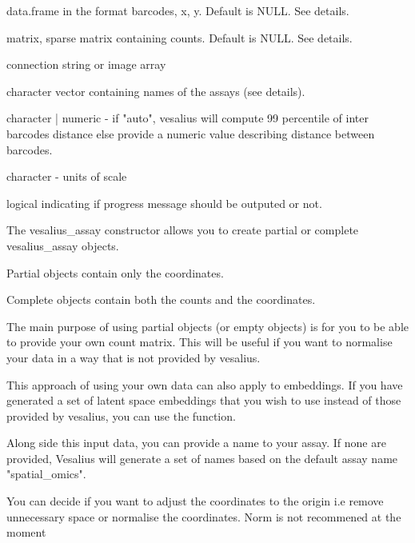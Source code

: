 \documentclass[a4paper]{book}
\begin{document}
\begin{Arguments}
\begin{ldescription}
\item[\code{coordinates}] data.frame in the format
barcodes, x, y.
Default is NULL. See details.

\item[\code{counts}] matrix, sparse matrix containing counts.
Default is NULL. See details.

\item[\code{image}] connection string or image array

\item[\code{assay}] character vector containing names of the assays
(see details).

\item[\code{scale}] character | numeric - if "auto", vesalius will compute
99 percentile of inter barcodes distance else provide a numeric value
describing distance between barcodes.

\item[\code{unit}] character - units of scale

\item[\code{verbose}] logical indicating if progress message should be
outputed or not.
\end{ldescription}
\end{Arguments}
%
\begin{Details}
The vesalius\_assay constructor allows you to create
partial or complete vesalius\_assay objects.

Partial objects contain only the coordinates.

Complete objects contain both the counts and the coordinates.

The main purpose of using partial objects (or empty objects) is 
for you to be able to provide your own count matrix. 
This will be useful if you want to normalise your data in a 
way that is not provided by vesalius.

This approach of using your own data can also apply to embeddings.
If you have generated a set of latent space embeddings that you 
wish to use instead of those provided by vesalius, you can 
use the  function. 


Along side this input data, you can provide a name 
to your assay. If none are provided, 
Vesalius will generate a set of names based on 
the default assay name "spatial\_omics".

You can decide if you want to adjust the coordinates to the 
origin i.e remove unnecessary space or normalise the coordinates.
Norm is not recommened at the moment
\end{Details}
\end{document}
